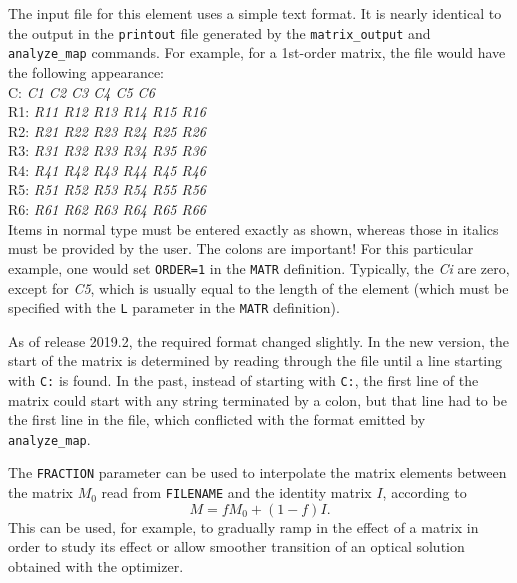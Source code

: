 The input file for this element uses a simple text format.  It is nearly identical
to the output in the {\tt printout} file generated by the {\tt matrix\_output}
and {\tt analyze\_map} commands.  For example, for a 1st-order matrix, the file would have the
following appearance:\\
C: {\em C1 C2 C3 C4 C5 C6}\\
R1: {\em R11 R12 R13 R14 R15 R16}\\
R2: {\em R21 R22 R23 R24 R25 R26}\\
R3: {\em R31 R32 R33 R34 R35 R36}\\
R4: {\em R41 R42 R43 R44 R45 R46}\\
R5: {\em R51 R52 R53 R54 R55 R56}\\
R6: {\em R61 R62 R63 R64 R65 R66}\\

Items in normal type must be entered exactly as shown, whereas those in
italics must be provided by the user.  The colons are important!
For this particular example, one would set {\tt ORDER=1} in the {\tt MATR}
definition.  Typically, the {\em Ci} are zero, except for {\em C5}, which
is usually equal to the length of the element (which must be specified with
the {\tt L} parameter in the {\tt MATR} definition).

As of release 2019.2, the required format changed slightly. 
In the new version, the start of the matrix is determined by reading through the file until 
a line starting with \verb|C:| is found.
In the past, 
instead of starting with \verb|C:|, the first line of the matrix could start
with any string terminated by a colon, but that line had to be the first line in the
file, which conflicted with the format emitted by \verb|analyze_map|.

The \verb|FRACTION| parameter can be used to interpolate the matrix elements between the
matrix $M_0$ read from \verb|FILENAME| and the identity matrix $I$, according to
\begin{equation}
M = fM_0 + (1-f)I.
\end{equation}
This can be used, for example, to gradually ramp in the effect of a matrix in order to
study its effect or allow smoother transition of an optical solution obtained with the
optimizer.

